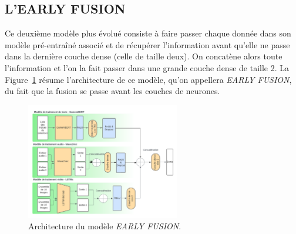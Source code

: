 \subsection{L'EARLY FUSION}
Ce deuxième modèle plus évolué consiste à faire passer chaque donnée dans son modèle pré-entraîné associé et de récupérer
l'information avant qu'elle ne passe dans la dernière couche dense (celle de taille deux). On concatène alors toute l'information 
et l'on la fait passer dans une grande couche dense de taille 2.
La Figure~\ref{fig: EARLY FUSION} résume l'architecture de ce modèle, qu'on appellera \textit{EARLY FUSION}, du fait que la fusion
se passe avant les couches de neurones.

\begin{figure}[H]
    \centering
    \includegraphics[width=0.6\textwidth]{image_model/early_fusion.png}
    \caption{Architecture du modèle \textit{EARLY FUSION}.}
    \label{fig: EARLY FUSION}
\end{figure}